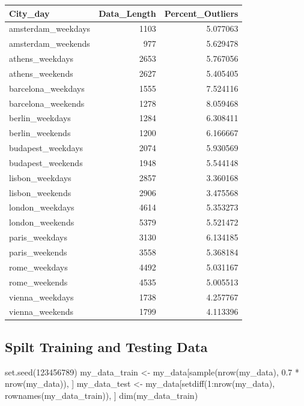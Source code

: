 \documentclass[
]{article}
\newenvironment{Shaded}{\begin{snugshade}}{\end{snugshade}}
\newcommand{\DecValTok}[1]{\textcolor[rgb]{0.00,0.00,0.81}{#1}}
\newcommand{\FloatTok}[1]{\textcolor[rgb]{0.00,0.00,0.81}{#1}}
\newcommand{\FunctionTok}[1]{\textcolor[rgb]{0.00,0.00,0.00}{#1}}
\newcommand{\NormalTok}[1]{#1}
\newcommand{\OtherTok}[1]{\textcolor[rgb]{0.56,0.35,0.01}{#1}}
\newcommand{\SpecialCharTok}[1]{\textcolor[rgb]{0.00,0.00,0.00}{#1}}
\begin{document}
\begin{longtable}[]{@{}lrr@{}}
\toprule()
City\_day & Data\_Length & Percent\_Outliers \\
\midrule()
\endhead
amsterdam\_weekdays & 1103 & 5.077063 \\
amsterdam\_weekends & 977 & 5.629478 \\
athens\_weekdays & 2653 & 5.767056 \\
athens\_weekends & 2627 & 5.405405 \\
barcelona\_weekdays & 1555 & 7.524116 \\
barcelona\_weekends & 1278 & 8.059468 \\
berlin\_weekdays & 1284 & 6.308411 \\
berlin\_weekends & 1200 & 6.166667 \\
budapest\_weekdays & 2074 & 5.930569 \\
budapest\_weekends & 1948 & 5.544148 \\
lisbon\_weekdays & 2857 & 3.360168 \\
lisbon\_weekends & 2906 & 3.475568 \\
london\_weekdays & 4614 & 5.353273 \\
london\_weekends & 5379 & 5.521472 \\
paris\_weekdays & 3130 & 6.134185 \\
paris\_weekends & 3558 & 5.368184 \\
rome\_weekdays & 4492 & 5.031167 \\
rome\_weekends & 4535 & 5.005513 \\
vienna\_weekdays & 1738 & 4.257767 \\
vienna\_weekends & 1799 & 4.113396 \\
\bottomrule()
\end{longtable}

\hypertarget{spilt-training-and-testing-data}{%
\subsection{Spilt Training and Testing
Data}\label{spilt-training-and-testing-data}}

\begin{Shaded}
\begin{Highlighting}[]
\FunctionTok{set.seed}\NormalTok{(}\DecValTok{123456789}\NormalTok{)}
\NormalTok{my\_data\_train }\OtherTok{\textless{}{-}}\NormalTok{ my\_data[}\FunctionTok{sample}\NormalTok{(}\FunctionTok{nrow}\NormalTok{(my\_data), }\FloatTok{0.7} \SpecialCharTok{*} \FunctionTok{nrow}\NormalTok{(my\_data)),}
\NormalTok{    ]}
\NormalTok{my\_data\_test }\OtherTok{\textless{}{-}}\NormalTok{ my\_data[}\FunctionTok{setdiff}\NormalTok{(}\DecValTok{1}\SpecialCharTok{:}\FunctionTok{nrow}\NormalTok{(my\_data), }\FunctionTok{rownames}\NormalTok{(my\_data\_train)),}
\NormalTok{    ]}
\FunctionTok{dim}\NormalTok{(my\_data\_train)}
\end{Highlighting}
\end{Shaded}
\end{document}

